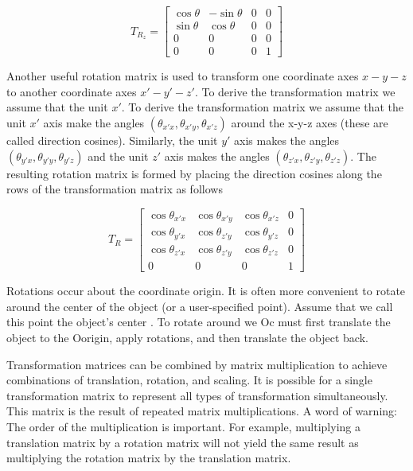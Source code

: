 \begin{equation}\label{eq:3.12}
T_{R_z} = \left[\begin{array}{cccc}
\cos\theta & -\sin\theta & 0 & 0 \\
\sin\theta & \cos\theta & 0 & 0 \\
0 & 0 & 0 & 0 \\
0 & 0 & 0 & 1
\end{array}\right]
\end{equation}

Another useful rotation matrix is used to transform one coordinate axes $x-y-z$ to another coordinate axes $x'-y'-z'$. To derive the transformation matrix we assume that the unit $x'$. To derive the transformation matrix we assume that the unit $x'$ axis make the angles $(\theta_{x'x},\theta_{x'y},\theta_{x'z})$ around the x-y-z axes (these are called direction cosines). Similarly, the unit $y'$ axis makes the angles $(\theta_{y'x},\theta_{y'y},\theta_{y'z})$ and the unit $z'$ axis makes the angles $(\theta_{z'x},\theta_{z'y},\theta_{z'z})$. The resulting rotation matrix is formed by placing the direction cosines along the rows of the transformation matrix as follows

\begin{equation}\label{eq:3.13}
T_R = \left[\begin{array}{cccc}
\cos\theta_{x'x} & \cos\theta_{x'y} & \cos\theta_{x'z} & 0 \\
\cos\theta_{y'x} & \cos\theta_{z'y} & \cos\theta_{y'z} & 0 \\
\cos\theta_{z'x} & \cos\theta_{z'y} & \cos\theta_{z'z} & 0 \\
0 & 0 & 0 & 1
\end{array}\right]
\end{equation}


Rotations occur about the coordinate origin. It is often more convenient to rotate around the center of the object (or a user-specified point). Assume that we call this point the object's center . To rotate around we Oc must first translate the object to the Oorigin, apply rotations, and then translate the object back.

Transformation matrices can be combined by matrix multiplication to achieve combinations of translation, rotation, and scaling. It is possible for a single transformation matrix to represent all types of transformation simultaneously. This matrix is the result of repeated matrix multiplications. A word of warning: The order of the multiplication is important. For example, multiplying a translation matrix by a rotation matrix will not yield the same result as multiplying the rotation matrix by the translation matrix.


